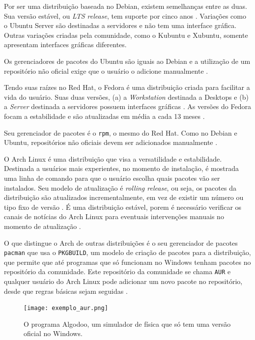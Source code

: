 \documentclass[
article,			%
12pt,				%
openright,			%
oneside,			%
a4paper,			%
chapter=TITLE,		%
section=TITLE,		%
subsection=TITLE,	%
subsubsection=TITLE,%
subsubsubsection=TITLE, %
english,			%
brazil,				%
]{abntex2}
\def\code#1{\texttt{#1}}
\begin{document}
Por ser uma distribuição baseada no Debian, existem semelhanças entre
as duas. Sua versão estável, ou \emph{LTS release}, tem suporte por
cinco anos \cite{UbuntuWiki2017}. Variações como o Ubuntu Server são
destinadas a servidores e não tem uma interface gráfica. Outras
variações criadas pela comunidade, como o Kubuntu e Xubuntu, somente
apresentam interfaces gráficas diferentes.

Os gerenciadores de pacotes do Ubuntu são iguais ao Debian e a
utilização de um repositório não oficial exige que o usuário o
adicione manualmente \cite{UbuntuWiki2018}.


Tendo suas raízes no Red Hat, o Fedora é uma distribuição criada para
facilitar a vida do usuário. Suas duas versões, (a) a
\emph{Workstation} destinada a Desktops e (b) a \emph{Server}
destinada a servidores possuem interfaces gráficas
\cite{FedoraProject2018}. As versões do Fedora focam a estabilidade e
são atualizadas em média a cada 13 meses \cite{FedoraProject2018a}.

Seu gerenciador de pacotes é o \code{rpm}, o mesmo do Red Hat. Como no
Debian e Ubuntu, repositórios não oficiais devem ser adicionados
manualmente \cite{FedoraProject2018b}.


O Arch Linux é uma distribuição que visa a versatilidade e
estabilidade. Destinada a usuários mais experientes, no momento de
instalação, é mostrada uma linha de comando para que o usuário escolha
quais pacotes vão ser instalados. Seu modelo de atualização é
\emph{rolling release}, ou seja, os pacotes da distribuição são
atualizados incrementalmente, em vez de existir um número ou tipo fixo
de versão \cite{ArchWiki2018a}. É uma distribuição estável, porem é
necessário verificar os canais de notícias do Arch Linux para
eventuais intervenções manuais no momento de atualização
\cite{ArchWiki2018c}.

O que distingue o Arch de outras distribuições é o seu gerenciador de
pacotes \code{pacman} que usa o \code{PKGBUILD}, um modelo de criação
de pacotes para a distribuição, que permite que até programas que só
funcionam no Windows tenham pacotes no repositório da comunidade. Este
repositório da comunidade se chama \code{AUR} e qualquer usuário do
Arch Linux pode adicionar um novo pacote no repositório, desde que
regras básicas sejam seguidas \cite{ArchWiki2018d}.

\begin{figure}[H]
    \caption{\label{fig:exemplo-aur}O programa Algodoo, um simulador
    de física que só tem uma versão oficial no Windows.}
    \begin{center}
        \texttt{[image: exemplo\_aur.png]}
    \end{center}
\end{figure}
\end{document}
